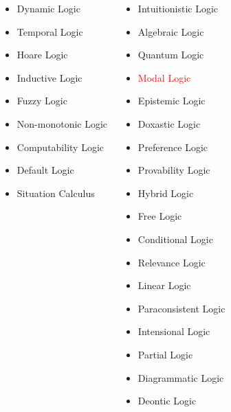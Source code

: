 \documentclass[UTF8,aspectratio=43,11pt,colorlinks,compress,openany]{beamer}%
\begin{document}
\begin{frame}[shrink]
{\begin{minipage}{1.1\textwidth}
\begin{columns}
\begin{itemize}
						\item Dynamic Logic
						\item Temporal Logic
						\item Hoare Logic
						\item Inductive Logic
						\item Fuzzy Logic
						\item Non-monotonic Logic
						\item Computability Logic
						\item Default Logic
						\item Situation Calculus
					\end{itemize}
					\begin{itemize}
						\item Intuitionistic Logic
						\item Algebraic Logic
						\item Quantum Logic
						\item \textcolor{red}{Modal Logic}
						\item Epistemic Logic
						\item Doxastic Logic
						\item Preference Logic
						\item Provability Logic
						\item Hybrid Logic
						\item Free Logic
						\item Conditional Logic
						\item Relevance Logic
						\item Linear Logic
						\item Paraconsistent Logic
						\item Intensional Logic
						\item Partial Logic
						\item Diagrammatic Logic
						\item Deontic Logic
					\end{itemize}
			\end{columns}
	\end{minipage}}
\end{frame}
\end{document}
